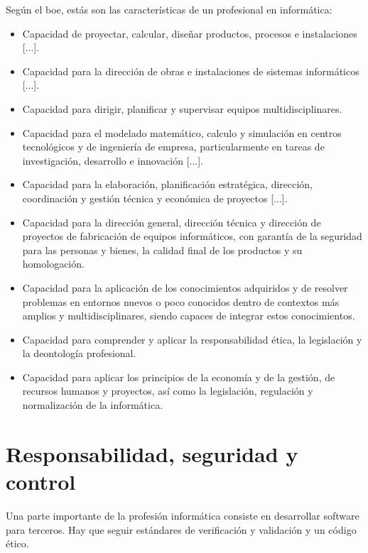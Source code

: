Según el \gls{boe}, estás son las características de un profesional en informática:
\begin{itemize}
    \item Capacidad de proyectar, calcular, diseñar productos, procesos e instalaciones [...].
    \item Capacidad para la dirección de obras e instalaciones de sistemas informáticos [...].
    \item Capacidad para dirigir, planificar y supervisar equipos multidisciplinares.
    \item Capacidad para el modelado matemático, calculo y simulación en centros tecnológicos y de ingeniería de empresa, particularmente en tareas de investigación, desarrollo e innovación [...].
    \item Capacidad para la elaboración, planificación estratégica, dirección, coordinación y gestión técnica y económica de proyectos [...].
    \item Capacidad para la dirección general, dirección técnica y dirección de proyectos de fabricación de equipos informáticos, con garantía de la seguridad para las personas y bienes, la calidad final de los productos y su homologación.
    \item Capacidad para la aplicación de los conocimientos adquiridos y de resolver problemas en entornos nuevos o poco conocidos dentro de contextos más amplios y multidisciplinares, siendo capaces de integrar estos conocimientos.
    \item Capacidad para comprender y aplicar la responsabilidad ética, la legislación y la deontología profesional.
    \item Capacidad para aplicar los principios de la economía y de la gestión, de recursos humanos y proyectos, así como la legislación, regulación y normalización de la informática.
\end{itemize}

\section{Responsabilidad, seguridad y control}

Una parte importante de la profesión informática consiste en desarrollar software para terceros. Hay que seguir estándares de verificación y validación y un código ético.

